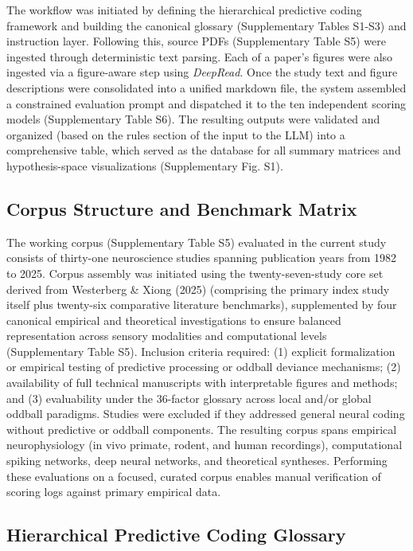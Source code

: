 \documentclass[12pt]{article}
\begin{document}
The workflow was initiated by defining the hierarchical predictive coding framework and building the canonical glossary (Supplementary Tables S1-S3) and instruction layer. Following this, source PDFs (Supplementary Table S5) were ingested through deterministic text parsing. Each of a paper's figures were also ingested via a figure-aware step using \emph{DeepRead}\cite{ref57}. Once the study text and figure descriptions were consolidated into a unified markdown file, the system assembled a constrained evaluation prompt and dispatched it to the ten independent scoring models (Supplementary Table S6). The resulting outputs were validated and organized (based on the rules section of the input to the LLM) into a comprehensive table, which served as the database for all summary matrices and hypothesis-space visualizations (Supplementary Fig. S1).

\subsection{Corpus Structure and Benchmark Matrix}\label{corpus-structure-and-benchmark-matrix}

The working corpus (Supplementary Table S5) evaluated in the current study consists of thirty-one neuroscience studies spanning publication years from 1982 to 2025. Corpus assembly was initiated using the twenty-seven-study core set derived from Westerberg \& Xiong (2025)\cite{ref34} (comprising the primary index study itself plus twenty-six comparative literature benchmarks), supplemented by four canonical empirical and theoretical investigations to ensure balanced representation across sensory modalities and computational levels (Supplementary Table S5). Inclusion criteria required: (1) explicit formalization or empirical testing of predictive processing or oddball deviance mechanisms; (2) availability of full technical manuscripts with interpretable figures and methods; and (3) evaluability under the 36-factor glossary across local and/or global oddball paradigms. Studies were excluded if they addressed general neural coding without predictive or oddball components. The resulting corpus spans empirical neurophysiology (in vivo primate, rodent, and human recordings), computational spiking networks, deep neural networks, and theoretical syntheses. Performing these evaluations on a focused, curated corpus enables manual verification of scoring logs against primary empirical data.

\subsection{Hierarchical Predictive Coding Glossary}\label{hierarchical-predictive-coding-glossary}
\end{document}
